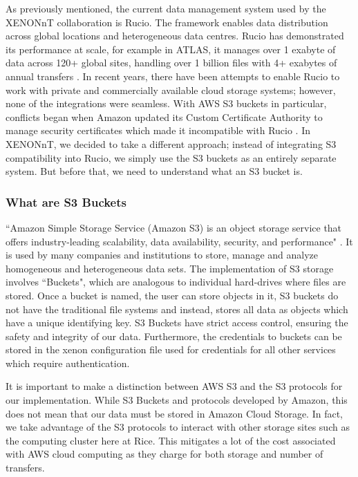 
As previously mentioned, the current data management system used by the XENONnT collaboration is Rucio. The framework enables data distribution across global locations and heterogeneous data centres. Rucio has demonstrated its performance at scale, for example in ATLAS, it manages over 1 exabyte of data across 120+ global sites, handling over 1 billion files with 4+ exabytes of annual transfers \cite{rucio_home}. In recent years, there have been attempts to enable Rucio to work with private and commercially available cloud storage systems; however, none of the integrations were seamless. With AWS S3 buckets in particular, conflicts began when Amazon updated its Custom Certificate Authority to manage security certificates which made it incompatible with Rucio \cite{Barisits2024}. In XENONnT, we decided to take a different approach; instead of integrating S3 compatibility into Rucio, we simply use the S3 buckets as an entirely separate system. But before that, we need to understand what an S3 bucket is.

\subsubsection{What are S3 Buckets}


``Amazon Simple Storage Service (Amazon S3) is an object storage service that offers industry-leading scalability, data availability, security, and performance" \cite{amazon_s3}. It is used by many companies and institutions to store, manage and analyze homogeneous and heterogeneous data sets. The implementation of S3 storage involves ``Buckets", which are analogous to individual hard-drives where files are stored. Once a bucket is named, the user can store objects in it, S3 buckets do not have the traditional file systems and instead, stores all data as objects which have a unique identifying key. S3 Buckets have strict access control, ensuring the safety and integrity of our data. Furthermore, the credentials to buckets can be stored in the xenon configuration file used for credentials for all other services which require authentication.


It is important to make a distinction between AWS S3 and the S3 protocols for our implementation. While S3 Buckets and protocols developed by Amazon, this does not mean that our data must be stored in Amazon Cloud Storage. In fact, we take advantage of the S3 protocols to interact with other storage sites such as the computing cluster here at Rice. This mitigates a lot of the cost associated with AWS cloud computing as they charge for both storage and number of transfers. 


